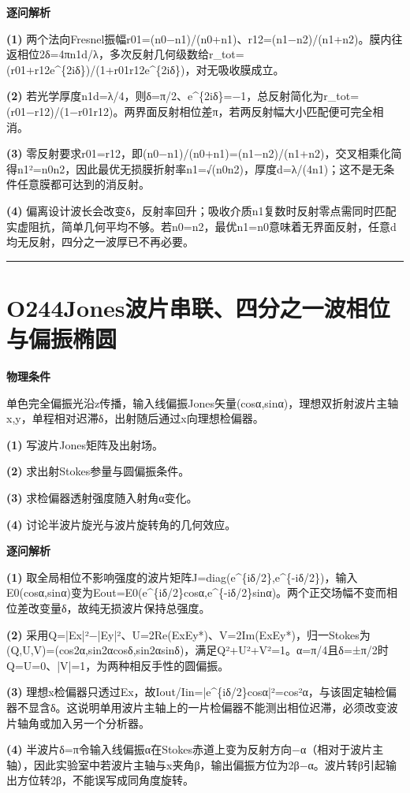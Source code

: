 \documentclass[UTF8,a4paper,11pt,oneside,openany]{ctexbook}
\begin{document}
\par\medskip\noindent\textbf{逐问解析}
\par\noindent\textbf{(1)} 两个法向Fresnel振幅r01=(n0−n1)/(n0+n1)、r12=(n1−n2)/(n1+n2)。膜内往返相位2δ=4πn1d/λ，多次反射几何级数给r\_tot=(r01+r12e\textasciicircum{}\{2iδ\})/(1+r01r12e\textasciicircum{}\{2iδ\})，对无吸收膜成立。
\par\noindent\textbf{(2)} 若光学厚度n1d=λ/4，则δ=π/2、e\textasciicircum{}\{2iδ\}=−1，总反射简化为r\_tot=(r01−r12)/(1−r01r12)。两界面反射相位差π，若两反射幅大小匹配便可完全相消。
\par\noindent\textbf{(3)} 零反射要求r01=r12，即(n0−n1)/(n0+n1)=(n1−n2)/(n1+n2)，交叉相乘化简得n1²=n0n2，因此最优无损膜折射率n1=√(n0n2)，厚度d=λ/(4n1)；这不是无条件任意膜都可达到的消反射。
\par\noindent\textbf{(4)} 偏离设计波长会改变δ，反射率回升；吸收介质n1复数时反射零点需同时匹配实虚阻抗，简单几何平均不够。若n0=n2，最优n1=n0意味着无界面反射，任意d均无反射，四分之一波厚已不再必要。

\par\bigskip\hrule\bigskip
\section*{O244\quad Jones波片串联、四分之一波相位与偏振椭圆}
\textbf{物理条件}\par 单色完全偏振光沿z传播，输入线偏振Jones矢量(cosα,sinα)，理想双折射波片主轴x,y，单程相对迟滞δ，出射随后通过x向理想检偏器。
\par\noindent\textbf{(1)} 写波片Jones矩阵及出射场。
\par\noindent\textbf{(2)} 求出射Stokes参量与圆偏振条件。
\par\noindent\textbf{(3)} 求检偏器透射强度随入射角α变化。
\par\noindent\textbf{(4)} 讨论半波片旋光与波片旋转角的几何效应。

\par\medskip\noindent\textbf{逐问解析}
\par\noindent\textbf{(1)} 取全局相位不影响强度的波片矩阵J=diag(e\textasciicircum{}\{iδ/2\},e\textasciicircum{}\{-iδ/2\})，输入E0(cosα,sinα)变为Eout=E0(e\textasciicircum{}\{iδ/2\}cosα,e\textasciicircum{}\{-iδ/2\}sinα)。两个正交场幅不变而相位差改变量δ，故纯无损波片保持总强度。
\par\noindent\textbf{(2)} 采用Q=|Ex|²−|Ey|²、U=2Re(ExEy*)、V=2Im(ExEy*)，归一Stokes为(Q,U,V)=(cos2α,sin2αcosδ,sin2αsinδ)，满足Q²+U²+V²=1。α=π/4且δ=±π/2时Q=U=0、|V|=1，为两种相反手性的圆偏振。
\par\noindent\textbf{(3)} 理想x检偏器只透过Ex，故Iout/Iin=|e\textasciicircum{}\{iδ/2\}cosα|²=cos²α，与该固定轴检偏器不显含δ。这说明单用波片主轴上的一片检偏器不能测出相位迟滞，必须改变波片轴角或加入另一个分析器。
\par\noindent\textbf{(4)} 半波片δ=π令输入线偏振α在Stokes赤道上变为反射方向−α（相对于波片主轴），因此实验室中若波片主轴与x夹角β，输出偏振方位为2β−α。波片转β引起输出方位转2β，不能误写成同角度旋转。
\end{document}
